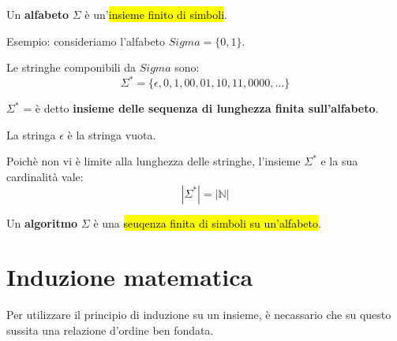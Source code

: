 \documentclass[a4paper, 12pt]{book}
\begin{document}
    \begin{tcolorbox}[
      colback=cyan!5!white,
      colframe=blue!50!black,
      title=\textbf{Definizione - alfabeto},
      coltitle=white,
      fonttitle=\bfseries,
      arc=3mm,
      boxrule=0.5pt,
      enhanced,
      breakable
    ]
      Un \textbf{alfabeto} $\Sigma$ è un'\hl{insieme finito di simboli}.
    \end{tcolorbox}

    \vspace{1.5mm}
    
    Esempio: consideriamo l'alfabeto $Sigma = \{0, 1\}$.

    Le stringhe componibili da $Sigma$ sono:
    \begin{equation*}
      \Sigma^{*} = \{\epsilon, 0, 1, 00, 01, 10, 11, 0000, \dots\}
    \end{equation*}

    $\Sigma^{*}$ = è detto \textbf{insieme delle sequenza di lunghezza finita sull'alfabeto}.

    La stringa $\epsilon$ è la stringa vuota.

    Poichè non vi è limite alla lunghezza delle stringhe, l'insieme $\Sigma^{*}$ e la sua cardinalità vale:
    \begin{equation*}
      |\Sigma^{*}| = |\mathbb{N}|
    \end{equation*}

    \vspace{3mm}

    \begin{tcolorbox}[
      colback=cyan!5!white,
      colframe=blue!50!black,
      title=\textbf{Definizione - algoritmo},
      coltitle=white,
      fonttitle=\bfseries,
      arc=3mm,
      boxrule=0.5pt,
      enhanced,
      breakable
    ]
      Un \textbf{algoritmo} $\Sigma$ è una \hl{seuqenza finita di simboli su un'alfabeto}.
    \end{tcolorbox}
    
    \section*{Induzione matematica}
    Per utilizzare il principio di induzione su un insieme, è necassario che su questo sussita una relazione d'ordine ben fondata.
\end{document}
